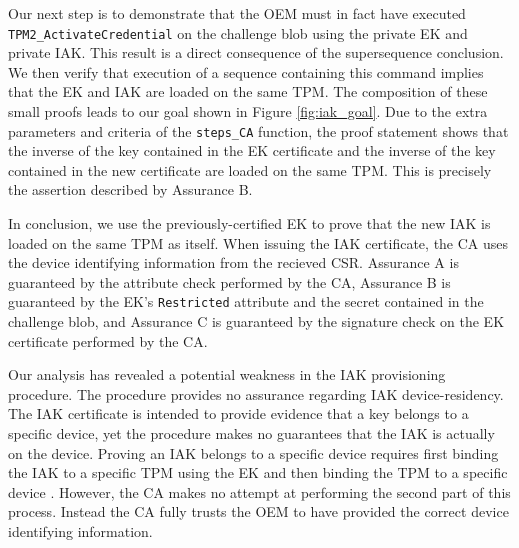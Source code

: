 \documentclass[runningheads]{llncs}
\begin{document}
Our next step is to demonstrate that the OEM must in fact have
executed \verb|TPM2_ActivateCredential| on the challenge blob using
the private EK and private IAK. This result is a direct consequence of
the supersequence conclusion. We then verify that execution of a
sequence containing this command implies that the EK and IAK are
loaded on the same TPM.  The composition of these small proofs leads
to our goal shown in Figure \ref{fig:iak_goal}.  Due to the extra
parameters and criteria of the \verb|steps_CA| function, the proof
statement shows that the inverse of the key contained in the EK
certificate and the inverse of the key contained in the new
certificate are loaded on the same TPM. This is precisely the
assertion described by Assurance B.

In conclusion, we use the previously-certified EK to prove that the new
IAK is loaded on the same TPM as itself. When issuing the IAK
certificate, the CA uses the device identifying information from the
recieved CSR.  Assurance A is guaranteed by the attribute check
performed by the CA, Assurance B is guaranteed by the EK's
\verb|Restricted| attribute and the secret contained in the challenge
blob, and Assurance C is guaranteed by the signature check on the EK
certificate performed by the CA.

Our analysis has revealed a potential weakness in the IAK provisioning
procedure. The procedure provides no assurance regarding IAK
device-residency.  The IAK certificate is intended to provide evidence
that a key belongs to a specific device, yet the procedure makes no
guarantees that the IAK is actually on the device.  Proving an IAK
belongs to a specific device requires first binding the IAK to a
specific TPM using the EK and then binding the TPM to a specific
device \citep{DevIDSpec-TCG}.  However, the CA makes no attempt at
performing the second part of this process. Instead the CA fully
trusts the OEM to have provided the correct device identifying
information.

\end{document}
